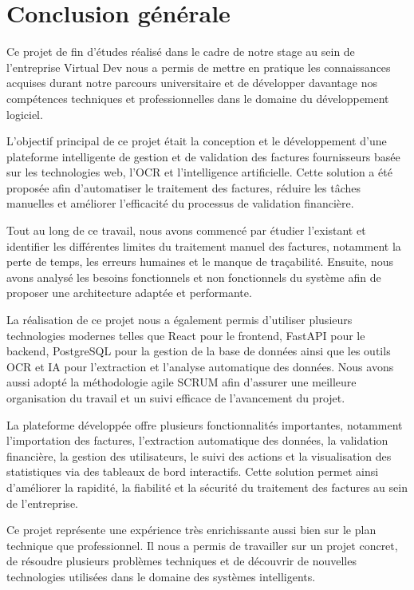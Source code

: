 \chapter*{Conclusion générale}

Ce projet de fin d’études réalisé dans le cadre de notre stage au sein de l’entreprise Virtual Dev nous a permis de mettre en pratique les connaissances acquises durant notre parcours universitaire et de développer davantage nos compétences techniques et professionnelles dans le domaine du développement logiciel.

L’objectif principal de ce projet était la conception et le développement d’une plateforme intelligente de gestion et de validation des factures fournisseurs basée sur les technologies web, l’OCR et l’intelligence artificielle. Cette solution a été proposée afin d’automatiser le traitement des factures, réduire les tâches manuelles et améliorer l’efficacité du processus de validation financière.

Tout au long de ce travail, nous avons commencé par étudier l’existant et identifier les différentes limites du traitement manuel des factures, notamment la perte de temps, les erreurs humaines et le manque de traçabilité. Ensuite, nous avons analysé les besoins fonctionnels et non fonctionnels du système afin de proposer une architecture adaptée et performante.

La réalisation de ce projet nous a également permis d’utiliser plusieurs technologies modernes telles que React pour le frontend, FastAPI pour le backend, PostgreSQL pour la gestion de la base de données ainsi que les outils OCR et IA pour l’extraction et l’analyse automatique des données. Nous avons aussi adopté la méthodologie agile SCRUM afin d’assurer une meilleure organisation du travail et un suivi efficace de l’avancement du projet.

La plateforme développée offre plusieurs fonctionnalités importantes, notamment l’importation des factures, l’extraction automatique des données, la validation financière, la gestion des utilisateurs, le suivi des actions et la visualisation des statistiques via des tableaux de bord interactifs. Cette solution permet ainsi d’améliorer la rapidité, la fiabilité et la sécurité du traitement des factures au sein de l’entreprise.

Ce projet représente une expérience très enrichissante aussi bien sur le plan technique que professionnel. Il nous a permis de travailler sur un projet concret, de résoudre plusieurs problèmes techniques et de découvrir de nouvelles technologies utilisées dans le domaine des systèmes intelligents.

